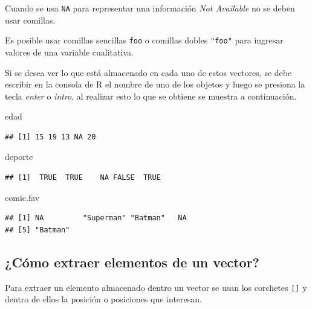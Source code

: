 \documentclass[10pt,]{krantz}
\makeatletter
\newenvironment{Shaded}{\begin{snugshade}}{\end{snugshade}}
\newcommand{\NormalTok}[1]{{#1}}
\let\proglang=\textsf
\newenvironment{kframe}{%
\medskip{}
\setlength{\fboxsep}{.8em}
 \def\at@end@of@kframe{}%
 \ifinner\ifhmode%
  \def\at@end@of@kframe{\end{minipage}}%
  \begin{minipage}{\columnwidth}%
 \fi\fi%
 \def\FrameCommand##1{\hskip\@totalleftmargin \hskip-\fboxsep
 \colorbox{shadecolor}{##1}\hskip-\fboxsep
     \hskip-\linewidth \hskip-\@totalleftmargin \hskip\columnwidth}%
 \MakeFramed {\advance\hsize-\width
   \@totalleftmargin\z@ \linewidth\hsize
   \@setminipage}}%
 {\par\unskip\endMakeFramed%
 \at@end@of@kframe}
\renewenvironment{Shaded}{\begin{kframe}}{\end{kframe}}
\let\BeginKnitrBlock\begin \let\EndKnitrBlock\end
\makeatother
\begin{document}
\BeginKnitrBlock{rmdwarning}
Cuando se usa \texttt{NA} para representar una información
\textit{Not Available} no se deben usar comillas.
\EndKnitrBlock{rmdwarning}

\BeginKnitrBlock{rmdnote}
Es posible usar comillas sencillas
\texttt{\textquotesingle{}foo\textquotesingle{}} o comillas dobles
\texttt{"foo"} para ingresar valores de una variable cualitativa.
\EndKnitrBlock{rmdnote}

Si se desea ver lo que está almacenado en cada uno de estos vectores, se
debe escribir en la consola de \proglang{R} el nombre de uno de los
objetos y luego se presiona la tecla \textit{enter} o \textit{intro}, al
realizar esto lo que se obtiene se muestra a continuación.

\begin{Shaded}
\begin{Highlighting}[]
\NormalTok{edad}
\end{Highlighting}
\end{Shaded}

\begin{verbatim}
## [1] 15 19 13 NA 20
\end{verbatim}

\begin{Shaded}
\begin{Highlighting}[]
\NormalTok{deporte}
\end{Highlighting}
\end{Shaded}

\begin{verbatim}
## [1]  TRUE  TRUE    NA FALSE  TRUE
\end{verbatim}

\begin{Shaded}
\begin{Highlighting}[]
\NormalTok{comic.fav}
\end{Highlighting}
\end{Shaded}

\begin{verbatim}
## [1] NA         "Superman" "Batman"   NA        
## [5] "Batman"
\end{verbatim}

\subsection{¿Cómo extraer elementos de un
vector?}\label{como-extraer-elementos-de-un-vector}

Para extraer un elemento almacenado dentro un vector se usan los
corchetes \texttt{{[}{]}} y dentro de ellos la posición o posiciones que
interesan.
\end{document}
